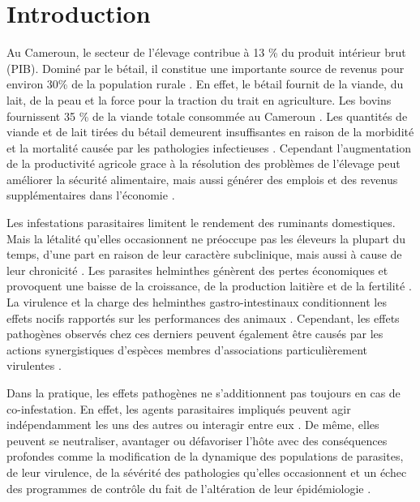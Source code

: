 \chapter*{Introduction}

Au Cameroun, le secteur de l’élevage contribue à 13 \% du produit intérieur brut (PIB). Dominé par le bétail, il constitue une importante source de revenus pour environ 30\% de la population rurale . En effet, le bétail fournit de la viande, du lait, de la peau et la force pour la traction du trait en agriculture. Les bovins fournissent 35 \% de la viande totale consommée au Cameroun . Les quantités de viande et de lait tirées du bétail demeurent insuffisantes en raison de la morbidité et la mortalité causée par les pathologies infectieuses . Cependant l'augmentation de la productivité agricole grace à la résolution des problèmes de l'élevage peut améliorer la sécurité alimentaire, mais aussi générer des emplois et des revenus supplémentaires dans l'économie .

\par Les infestations parasitaires limitent le rendement des ruminants domestiques. Mais la létalité qu'elles occasionnent ne préoccupe pas les éleveurs la plupart du temps, d'une part en raison de leur caractère subclinique, mais aussi à cause de leur chronicité . Les parasites helminthes génèrent des pertes économiques et provoquent une baisse de la croissance, de la production laitière et de la fertilité . La virulence et la charge des helminthes gastro-intestinaux conditionnent les effets nocifs rapportés sur les performances des animaux . Cependant, les effets pathogènes observés chez ces derniers peuvent également être causés par les actions synergistiques d'espèces membres d'associations particulièrement virulentes . 

\par Dans la pratique, les effets pathogènes ne s’additionnent pas toujours en cas de co-infestation. En effet, les agents parasitaires impliqués peuvent agir indépendamment les uns des autres ou interagir entre eux . De même, elles peuvent se neutraliser, avantager ou défavoriser l'hôte  avec des conséquences profondes comme la modification de la dynamique des populations de parasites, de leur virulence, de la sévérité des pathologies qu’elles occasionnent et un échec des programmes de contrôle du fait de l’altération de leur épidémiologie .

